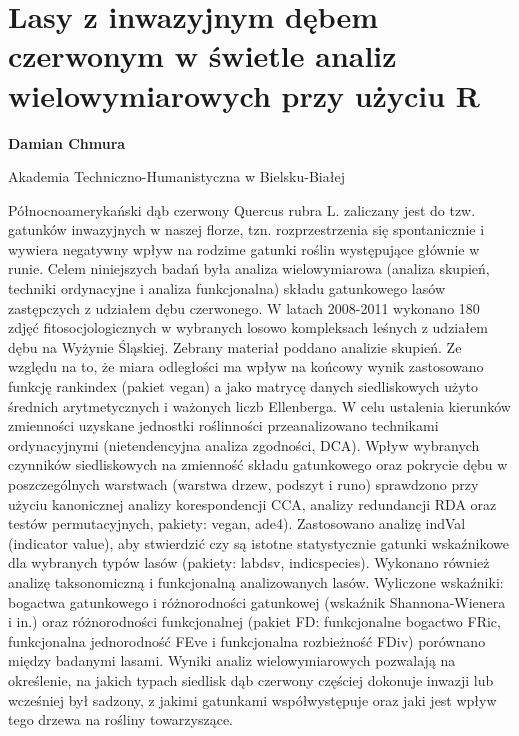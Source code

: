 \documentclass[\main/boa.tex]{subfiles}
\begin{document}
\section{Lasy z inwazyjnym dębem czerwonym w świetle analiz wielowymiarowych przy użyciu R }

\begin{minipage}{0.915\textwidth}
	\centering
  {\bf {} Damian Chmura }
\end{minipage}


\begin{affiliations}
\begin{minipage}{0.915\textwidth}
\centering
Akademia Techniczno-Humanistyczna w Bielsku-Białej  \\[-2pt]
\end{minipage}
\end{affiliations}

\vskip 0.3cm

 Północnoamerykański dąb czerwony Quercus rubra L. zaliczany jest do tzw. gatunków inwazyjnych w naszej florze, tzn. rozprzestrzenia się spontanicznie i wywiera negatywny wpływ na rodzime gatunki roślin występujące głównie w runie. Celem niniejszych badań była analiza wielowymiarowa (analiza skupień, techniki ordynacyjne i analiza funkcjonalna) składu gatunkowego lasów zastępczych z udziałem dębu czerwonego. W latach 2008-2011 wykonano 180 zdjęć fitosocjologicznych w wybranych losowo kompleksach leśnych z udziałem dębu na Wyżynie Śląskiej. Zebrany materiał poddano analizie skupień. Ze względu na to, że miara odległości ma wpływ na końcowy wynik zastosowano funkcję rankindex (pakiet vegan) a jako matrycę danych siedliskowych użyto średnich arytmetycznych i ważonych liczb Ellenberga. W celu ustalenia kierunków zmienności uzyskane jednostki roślinności przeanalizowano technikami ordynacyjnymi (nietendencyjna analiza zgodności, DCA). Wpływ wybranych czynników siedliskowych na zmienność składu gatunkowego oraz pokrycie dębu w poszczególnych warstwach (warstwa drzew, podszyt i runo) sprawdzono przy użyciu kanonicznej analizy korespondencji CCA, analizy redundancji RDA oraz testów permutacyjnych, pakiety: vegan, ade4). Zastosowano analizę indVal (indicator value), aby stwierdzić czy są istotne statystycznie gatunki wskaźnikowe dla wybranych typów lasów (pakiety: labdsv, indicspecies). Wykonano również analizę taksonomiczną i funkcjonalną analizowanych lasów. Wyliczone wskaźniki: bogactwa gatunkowego i różnorodności gatunkowej (wskaźnik Shannona-Wienera i in.) oraz różnorodności funkcjonalnej (pakiet FD: funkcjonalne bogactwo FRic, funkcjonalna jednorodność FEve i funkcjonalna rozbieżność FDiv) porównano między badanymi lasami. Wyniki analiz wielowymiarowych pozwalają na określenie, na jakich typach siedlisk dąb czerwony częściej dokonuje inwazji lub wcześniej był sadzony, z jakimi gatunkami współwystępuje oraz jaki jest wpływ tego drzewa na rośliny towarzyszące. 
\end{document}

